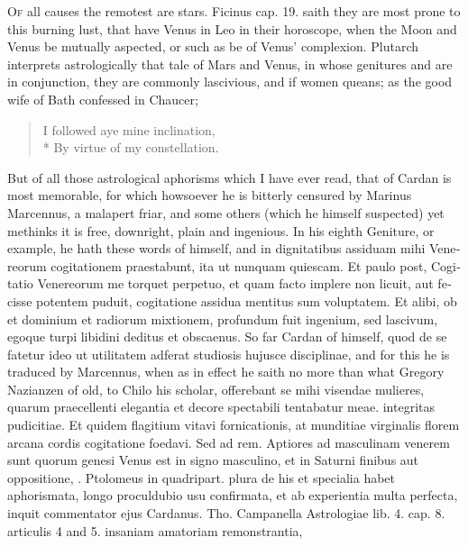{\lettrine{O}{f} all causes the remotest are stars. Ficinus cap. 19. saith they
are most prone to this burning lust, that have Venus in Leo in their
horoscope, when the Moon and Venus be mutually aspected, or such as be
of Venus' complexion. Plutarch interprets astrologically that
tale of Mars and Venus, in whose genitures \Mars{} and \venus{} are in conjunction,
they are commonly lascivious, and if women queans; as the good wife of
Bath confessed in Chaucer;

{\gothfont
\begin{verse}
I followed aye mine inclination,\\*
By virtue of my constellation.
\end{verse}
}

But of all those astrological aphorisms which I have ever read, that of
Cardan is most memorable, for which howsoever he is bitterly censured
by Marinus Marcennus, a malapert friar, and some others (which
 he himself suspected) yet methinks it is free, downright, plain
and ingenious. In his eighth Geniture, or example, he hath these
words of himself, \conjunction{} \Venus{} and \Mercury in \Mercury \textlatin{dignitatibus assiduam mihi Venereorum
cogitationem praestabunt, ita ut nunquam quiescam. Et paulo post,
Cogitatio Venereorum me torquet perpetuo, et quam facto implere non
licuit, aut fecisse potentem puduit, cogitatione assidua mentitus sum
voluptatem. Et alibi, ob \leftmoon{} et \Mercury{} dominium et radiorum mixtionem,
profundum fuit ingenium, sed lascivum, egoque turpi libidini deditus et
obscaenus}. So far Cardan of himself, quod de se fatetur ideo ut
utilitatem adferat studiosis hujusce disciplinae, and for this he is
traduced by Marcennus, when as in effect he saith no more than what
Gregory Nazianzen of old, to Chilo his scholar, offerebant se mihi
visendae mulieres, quarum praecellenti elegantia et decore spectabili
tentabatur meae. integritas pudicitiae. Et quidem flagitium vitavi
fornicationis, at munditiae virginalis florem arcana cordis cogitatione
foedavi. Sed ad rem. Aptiores ad masculinam venerem sunt quorum genesi
Venus est in signo masculino, et in Saturni finibus aut oppositione,
\etc{}. Ptolomeus in quadripart. plura de his et specialia habet
aphorismata, longo proculdubio usu confirmata, et ab experientia multa
perfecta, inquit commentator ejus Cardanus. Tho. Campanella Astrologiae
lib. 4. cap. 8. articulis 4 and 5. insaniam amatoriam remonstrantia,
}
